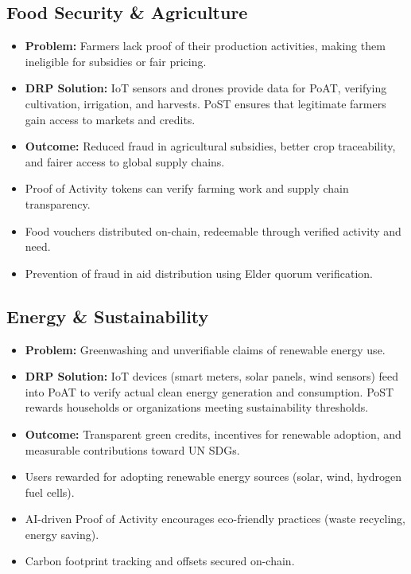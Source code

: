 \documentclass[11pt,a4paper]{article}
\begin{document}
\subsection{Food Security \& Agriculture}
\begin{itemize}
    \item \textbf{Problem:} Farmers lack proof of their production activities, making them ineligible for subsidies or fair pricing.
    \item \textbf{DRP Solution:} IoT sensors and drones provide data for PoAT, verifying cultivation, irrigation, and harvests. PoST ensures that legitimate farmers gain access to markets and credits.
    \item \textbf{Outcome:} Reduced fraud in agricultural subsidies, better crop traceability, and fairer access to global supply chains.
    \item Proof of Activity tokens can verify farming work and supply chain transparency.
    \item Food vouchers distributed on-chain, redeemable through verified activity and need.
    \item Prevention of fraud in aid distribution using Elder quorum verification.
\end{itemize}

\subsection{Energy \& Sustainability}
\begin{itemize}
    \item \textbf{Problem:} Greenwashing and unverifiable claims of renewable energy use.
    \item \textbf{DRP Solution:} IoT devices (smart meters, solar panels, wind sensors) feed into PoAT to verify actual clean energy generation and consumption. PoST rewards households or organizations meeting sustainability thresholds.
    \item \textbf{Outcome:} Transparent green credits, incentives for renewable adoption, and measurable contributions toward UN SDGs.
    \item Users rewarded for adopting renewable energy sources (solar, wind, hydrogen fuel cells).
    \item AI-driven Proof of Activity encourages eco-friendly practices (waste recycling, energy saving).
    \item Carbon footprint tracking and offsets secured on-chain.
\end{itemize}
\end{document}
